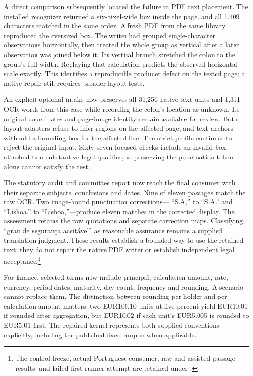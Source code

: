 A direct comparison subsequently located the failure in PDF text placement.
The installed recognizer returned a six-pixel-wide box inside the page, and
all 1,409 characters matched in the same order.  A fresh PDF from the same
library reproduced the oversized box.  The writer had grouped single-character
observations horizontally, then treated the whole group as vertical after a
later observation was joined below it.  Its vertical branch stretched the
colon to the group's full width.  Replaying that calculation predicts the
observed horizontal scale exactly.  This identifies a reproducible producer
defect on the tested page; a native repair still requires broader layout tests.

An explicit optional intake now preserves all 31,256 native text units and
1,311 OCR words from this case while recording the colon's location as unknown.
Its original coordinates and page-image identity remain available for review.
Both layout adapters refuse to infer regions on the affected page, and text
anchors withhold a bounding box for the affected line.  The strict profile
continues to reject the original input.  Sixty-seven focused checks include
an invalid box attached to a substantive legal qualifier, so preserving the
punctuation token alone cannot satisfy the test.

\begingroup{}
The statutory audit and committee report now reach the final consumer with
their separate subjects, conclusions and dates.  Nine of eleven passages
match the raw OCR.  Two image-bound punctuation corrections---
``S.A,'' to ``S.A.'' and ``Lisboa.'' to
``Lisboa,''---produce eleven matches in the corrected display.
The assessment retains the raw quotations and separate correction maps.
Classifying ``grau de seguran\c{c}a aceit\'avel'' as reasonable assurance
remains a supplied translation judgment.  These results establish a bounded
way to use the retained text; they do not repair the native PDF writer or
establish independent legal acceptance.\footnote{The control freeze, actual
Portuguese consumer, raw and assisted passage results, and failed first
runner attempt are retained under
.}
\par\endgroup

For finance, selected terms now include principal, calculation amount, rate,
currency, period dates, maturity, day-count, frequency and rounding.  A scenario
cannot replace them.  The distinction between rounding per holder and per
calculation amount matters: two EUR100.10 units at five percent yield EUR10.01
if rounded after aggregation, but EUR10.02 if each unit's EUR5.005 is rounded
to EUR5.01 first.  The repaired kernel represents both supplied conventions
explicitly, including the published fixed coupon when applicable.

